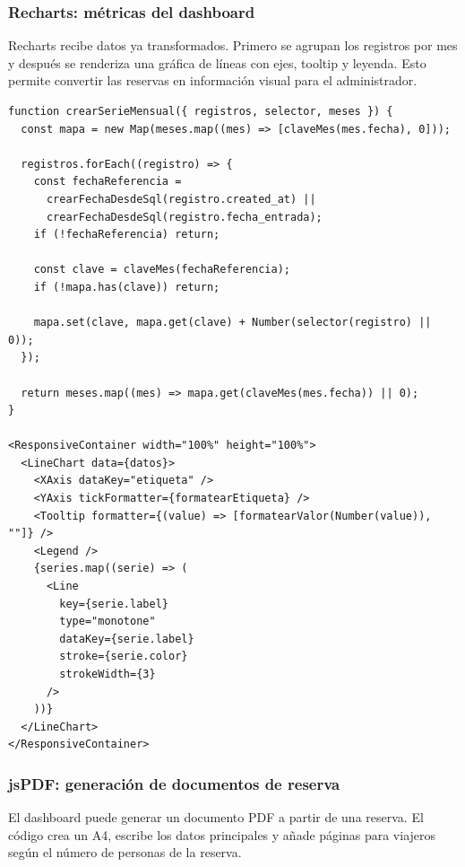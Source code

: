 \documentclass[11pt,a4paper]{article}
\begin{document}
\subsubsection{Recharts: métricas del dashboard}
Recharts recibe datos ya transformados. Primero se agrupan los registros por mes y después se renderiza una gráfica de líneas con ejes, tooltip y leyenda. Esto permite convertir las reservas en información visual para el administrador.

\begin{verbatim}
function crearSerieMensual({ registros, selector, meses }) {
  const mapa = new Map(meses.map((mes) => [claveMes(mes.fecha), 0]));

  registros.forEach((registro) => {
    const fechaReferencia =
      crearFechaDesdeSql(registro.created_at) ||
      crearFechaDesdeSql(registro.fecha_entrada);
    if (!fechaReferencia) return;

    const clave = claveMes(fechaReferencia);
    if (!mapa.has(clave)) return;

    mapa.set(clave, mapa.get(clave) + Number(selector(registro) || 0));
  });

  return meses.map((mes) => mapa.get(claveMes(mes.fecha)) || 0);
}

<ResponsiveContainer width="100%" height="100%">
  <LineChart data={datos}>
    <XAxis dataKey="etiqueta" />
    <YAxis tickFormatter={formatearEtiqueta} />
    <Tooltip formatter={(value) => [formatearValor(Number(value)), ""]} />
    <Legend />
    {series.map((serie) => (
      <Line
        key={serie.label}
        type="monotone"
        dataKey={serie.label}
        stroke={serie.color}
        strokeWidth={3}
      />
    ))}
  </LineChart>
</ResponsiveContainer>
\end{verbatim}

\subsubsection{jsPDF: generación de documentos de reserva}
El dashboard puede generar un documento PDF a partir de una reserva. El código crea un A4, escribe los datos principales y añade páginas para viajeros según el número de personas de la reserva.
\end{document}
